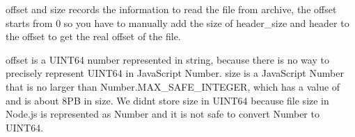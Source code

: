 {\ttfamily offset} and {\ttfamily size} records the information to read the file from archive, the {\ttfamily offset} starts from 0 so you have to manually add the size of {\ttfamily header\+\_\+size} and {\ttfamily header} to the {\ttfamily offset} to get the real offset of the file.

{\ttfamily offset} is a U\+I\+N\+T64 number represented in string, because there is no way to precisely represent U\+I\+N\+T64 in Java\+Script {\ttfamily Number}. {\ttfamily size} is a Java\+Script {\ttfamily Number} that is no larger than {\ttfamily Number.\+M\+A\+X\+\_\+\+S\+A\+F\+E\+\_\+\+I\+N\+T\+E\+G\+ER}, which has a value of {} and is about 8\+PB in size. We didn\textquotesingle{}t store {\ttfamily size} in U\+I\+N\+T64 because file size in Node.\+js is represented as {\ttfamily Number} and it is not safe to convert {\ttfamily Number} to U\+I\+N\+T64. 